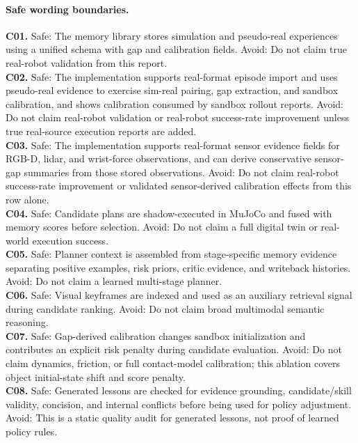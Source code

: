 \paragraph{Safe wording boundaries.}
\noindent\textbf{C01.} Safe: The memory library stores simulation and pseudo-real experiences using a unified schema with gap and calibration fields. Avoid: Do not claim true real-robot validation from this report.\\
\noindent\textbf{C02.} Safe: The implementation supports real-format episode import and uses pseudo-real evidence to exercise sim-real pairing, gap extraction, and sandbox calibration, and shows calibration consumed by sandbox rollout reports. Avoid: Do not claim real-robot validation or real-robot success-rate improvement unless true real-source execution reports are added.\\
\noindent\textbf{C03.} Safe: The implementation supports real-format sensor evidence fields for RGB-D, lidar, and wrist-force observations, and can derive conservative sensor-gap summaries from those stored observations. Avoid: Do not claim real-robot success-rate improvement or validated sensor-derived calibration effects from this row alone.\\
\noindent\textbf{C04.} Safe: Candidate plans are shadow-executed in MuJoCo and fused with memory scores before selection. Avoid: Do not claim a full digital twin or real-world execution success.\\
\noindent\textbf{C05.} Safe: Planner context is assembled from stage-specific memory evidence separating positive examples, risk priors, critic evidence, and writeback histories. Avoid: Do not claim a learned multi-stage planner.\\
\noindent\textbf{C06.} Safe: Visual keyframes are indexed and used as an auxiliary retrieval signal during candidate ranking. Avoid: Do not claim broad multimodal semantic reasoning.\\
\noindent\textbf{C07.} Safe: Gap-derived calibration changes sandbox initialization and contributes an explicit risk penalty during candidate evaluation. Avoid: Do not claim dynamics, friction, or full contact-model calibration; this ablation covers object initial-state shift and score penalty.\\
\noindent\textbf{C08.} Safe: Generated lessons are checked for evidence grounding, candidate/skill validity, concision, and internal conflicts before being used for policy adjustment. Avoid: This is a static quality audit for generated lessons, not proof of learned policy rules.\\
